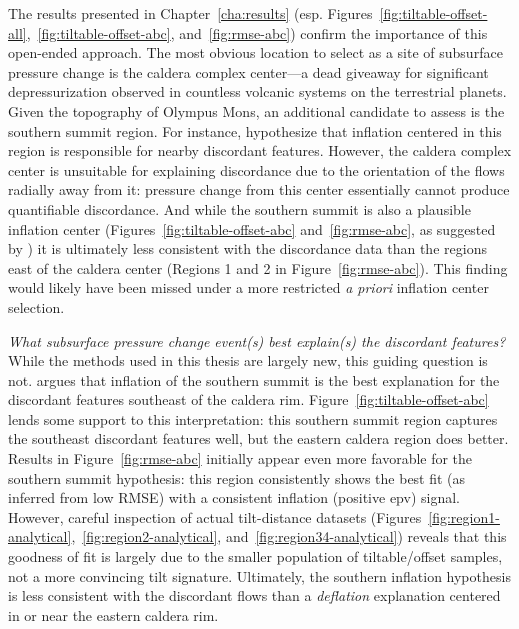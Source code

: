 The results presented in Chapter~\ref{cha:results} (esp. Figures~\ref{fig:tiltable-offset-all},~\ref{fig:tiltable-offset-abc}, and~\ref{fig:rmse-abc}) confirm the importance of this open-ended approach. The most obvious location to select as a site of subsurface pressure change is the caldera complex center---a dead giveaway for significant depressurization observed in countless volcanic systems on the terrestrial planets. Given the topography of Olympus Mons, an additional candidate to assess is the southern summit region. For instance, \textcite{mouginis-mark_late-stage_2019} hypothesize that inflation centered in this region is responsible for nearby discordant features. However, the caldera complex center is unsuitable for explaining discordance due to the orientation of the flows radially away from it: pressure change from this center essentially cannot produce quantifiable discordance. And while the southern summit is also a plausible inflation center (Figures~\ref{fig:tiltable-offset-abc} and~\ref{fig:rmse-abc}, as suggested by \parencite{mouginis-mark_late-stage_2019}) it is ultimately less consistent with the discordance data than the regions east of the caldera center (Regions 1 and 2 in Figure~\ref{fig:rmse-abc}). This finding would likely have been missed under a more restricted \emph{a priori} inflation center selection. 

\emph{What subsurface pressure change event(s) best explain(s) the discordant features?} While the methods used in this thesis are largely new, this guiding question is not. \parencite{mouginis-mark_late-stage_2019} argues that inflation of the southern summit is the best explanation for the discordant features southeast of the caldera rim. Figure~\ref{fig:tiltable-offset-abc} lends some support to this interpretation: this southern summit region captures the southeast discordant features well, but the eastern caldera region does better. Results in Figure~\ref{fig:rmse-abc} initially appear even more favorable for the southern summit hypothesis: this region consistently shows the best fit (as inferred from low \acs{RMSE}) with a consistent inflation (positive \acs{epv}) signal. However, careful inspection of actual tilt-distance datasets (Figures~\ref{fig:region1-analytical},~\ref{fig:region2-analytical}, and~\ref{fig:region34-analytical}) reveals that this goodness of fit is largely due to the smaller population of tiltable/offset samples, not a more convincing tilt signature. Ultimately, the southern inflation hypothesis is less consistent with the discordant flows than a \emph{deflation} explanation centered in or near the eastern caldera rim.

